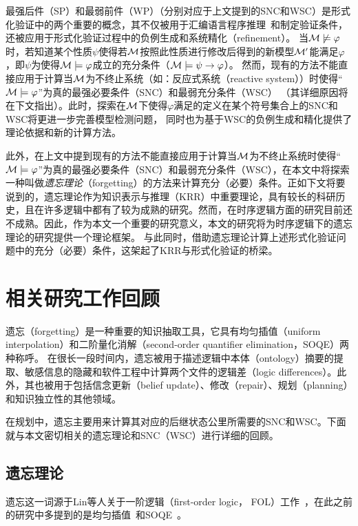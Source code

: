 最强后件（SP）和最弱前件（WP）（分别对应于上文提到的SNC和WSC）是形式化验证中的两个重要的概念，其不仅被用于汇编语言程序推理~\cite{legato2002weakest}和制定验证条件\cite{DBLP:journals/ipl/Leino05}，还被应用于形式化验证过程中的负例生成\cite{dailler2018instrumenting}和系统精化（refinement）\cite{woodcock1990refinement}。
当${\cal M}\not \models \varphi$时，若知道某个性质$\psi$使得若${\cal M}$按照此性质进行修改后得到的新模型${\cal M}'$能满足$\varphi$，即$\psi$为使得${\cal M}\models \varphi$成立的充分条件（${\cal M} \models \psi\rightarrow \varphi$）。
然而，现有的方法不能直接应用于计算当${\cal M}$为不终止系统（如：反应式系统（reactive system））时使得“${\cal M}\models \varphi$”为真的最强必要条件（SNC）和最弱充分条件（WSC）
（其详细原因将在下文指出）。此时，探索在${\cal M}$下使得$\varphi$满足的定义在某个符号集合上的SNC和WSC将更进一步完善模型检测问题，
同时也为基于WSC的负例生成和精化提供了理论依据和新的计算方法。

此外，在上文中提到现有的方法不能直接应用于计算当${\cal M}$为不终止系统时使得“${\cal M}\models \varphi$”为真的最强必要条件（SNC）和最弱充分条件（WSC），在本文中将探索一种叫做\emph{遗忘理论}（forgetting）的方法来计算充分（必要）条件。正如下文将要说到的，遗忘理论作为知识表示与推理（KRR）中重要理论，具有较长的科研历史，且在许多逻辑中都有了较为成熟的研究。然而，在时序逻辑方面的研究目前还不成熟。因此，作为本文一个重要的研究意义，本文的研究将为时序逻辑下的遗忘理论的研究提供一个理论框架。
与此同时，借助遗忘理论计算上述形式化验证问题中的充分（必要）条件，这架起了KRR与形式化验证的桥梁。

\section{相关研究工作回顾}

遗忘（forgetting）是一种重要的知识抽取工具，它具有均匀插值（uniform interpolation）和二阶量化消解（second-order quantifier elimination，SOQE）两种称呼。
在很长一段时间内，遗忘被用于描述逻辑中本体（ontology）摘要的提取、敏感信息的隐藏和软件工程中计算两个文件的逻辑差（logic differences）。此外，其也被用于包括信念更新（belief update）、修改（repair）、规划（planning）和知识独立性的其他领域。

在规划中，遗忘主要用来计算其对应的后继状态公里所需要的SNC和WSC。下面就与本文密切相关的遗忘理论和SNC（WSC）进行详细的回顾。






\subsection{遗忘理论}\label{chapter01:forgetting}
遗忘这一词源于Lin等人关于一阶逻辑（first-order logic， FOL）工作~\cite{lin1994forget}，在此之前的研究中多提到的是均匀插值~\cite{visser1996uniform,konev2009forgetting}和SOQE~\cite{ackermann1935untersuchungen}。

